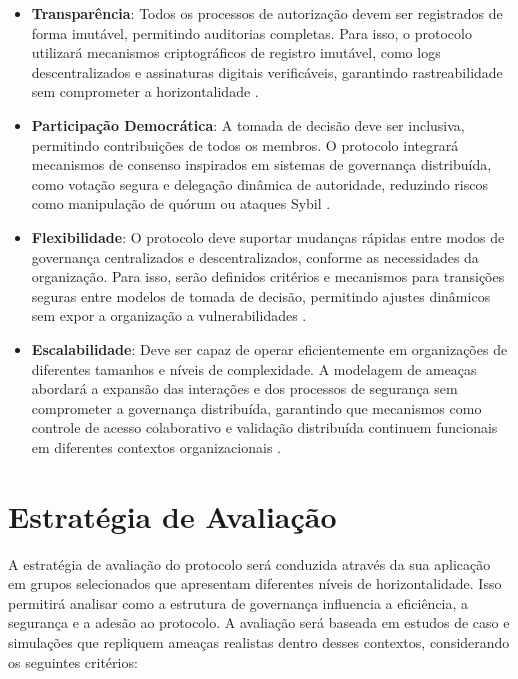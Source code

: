 \begin{itemize}

    \item \textbf{Transparência}: Todos os processos de autorização devem ser
registrados de forma imutável, permitindo auditorias completas. Para isso, o
protocolo utilizará mecanismos criptográficos de registro imutável, como logs
descentralizados e assinaturas digitais verificáveis, garantindo rastreabilidade
sem comprometer a horizontalidade \cite{Reputation-basedDAO}.
    
    \item \textbf{Participação Democrática}: A tomada de decisão deve ser
inclusiva, permitindo contribuições de todos os membros. O protocolo integrará
mecanismos de consenso inspirados em sistemas de governança distribuída, como
votação segura e delegação dinâmica de autoridade, reduzindo riscos como
manipulação de quórum ou ataques Sybil \cite{Colbac}.
    
    \item \textbf{Flexibilidade}: O protocolo deve suportar mudanças rápidas
entre modos de governança centralizados e descentralizados, conforme as
necessidades da organização. Para isso, serão definidos critérios e mecanismos
para transições seguras entre modelos de tomada de decisão, permitindo ajustes
dinâmicos sem expor a organização a vulnerabilidades \cite{Colbac}.
    
    \item \textbf{Escalabilidade}: Deve ser capaz de operar eficientemente em
organizações de diferentes tamanhos e níveis de complexidade. A modelagem de
ameaças abordará a expansão das interações e dos processos de segurança sem
comprometer a governança distribuída, garantindo que mecanismos como controle de
acesso colaborativo e validação distribuída continuem funcionais em diferentes
contextos organizacionais \cite{AbcCrypto}.

\end{itemize}

\section{Estratégia de Avaliação}
\label{sec:evaluation_strategy}

A estratégia de avaliação do protocolo será conduzida através da sua aplicação
em grupos selecionados que apresentam diferentes níveis de horizontalidade. Isso
permitirá analisar como a estrutura de governança influencia a eficiência, a
segurança e a adesão ao protocolo. A avaliação será baseada em estudos de caso e
simulações que repliquem ameaças realistas dentro desses contextos, considerando
os seguintes critérios:

